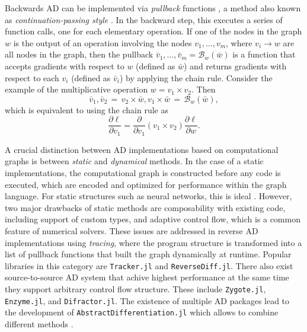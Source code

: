 Backwards AD can be implemented via \textit{pullback} functions \cite{Innes_2018}, a method also known as \textit{continuation-passing style} \cite{Wang_Zheng_Decker_Wu_Essertel_Rompf_2019}.
In the backward step, this executes a series of function calls, one for each elementary operation.
If one of the nodes in the graph $w$ is the output of an operation involving the nodes $v_1, \ldots, v_m$, where $v_i \rightarrow w$ are all nodes in the graph, then the pullback $\bar v_1, \ldots, \bar v_m = \mathcal B_w(\bar w)$ is a function that accepts gradients with respect to $w$ (defined as $\bar w$) and returns gradients with respect to each $v_i$ (defined as $\bar v_i$) by applying the chain rule. 
Consider the example of the multiplicative operation $w = v_1 \times v_2$. Then
\begin{equation}
 \bar v_1, \bar v_2 
 \,=\,
 v_2 \times \bar w , 
 v_1 \times \bar w 
 \,=\,
 \mathcal{B}_w (\bar w),
\end{equation}
which is equivalent to using the chain rule as
\begin{equation}
 \frac{\partial \ell}{\partial v_1} = \frac{\partial}{\partial v_1}(v_1 \times v_2) \frac{\partial \ell}{\partial w}.
\end{equation}


A crucial distinction between AD implementations based on computational graphs is between \textit{static} and \textit{dynamical} methods\cite{Baydin_Pearlmutter_Radul_Siskind_2015}. 
In the case of a static implementations, the computational graph is constructed before any code is executed, which are encoded and optimized for performance within the graph language. 
For static structures such as neural networks, this is ideal \cite{abadi-tensorflow}. 
However, two major drawbacks of static methods are composability with existing code, including support of custom types, and adaptive control flow, which is a common feature of numerical solvers. 
These issues are addressed in reverse AD implementations using \textit{tracing}, where the program structure is transformed into a list of pullback functions that built the graph dynamically at runtime. 
Popular libraries in this category are \texttt{Tracker.jl} and \texttt{ReverseDiff.jl}.
There also exist source-to-source AD system that achive highest performance at the same time they support arbitrary control flow structure. 
These include \texttt{Zygote.jl}\cite{Innes_Zygote}, \texttt{Enzyme.jl}\cite{moses_Enzyme}, and \texttt{Difractor.jl}.
The existence of multiple AD packages lead to the development of \texttt{AbstractDifferentiation.jl} which allows to combine different methods \cite{Schäfer_Tarek_White_Rackauckas_2021}. 


